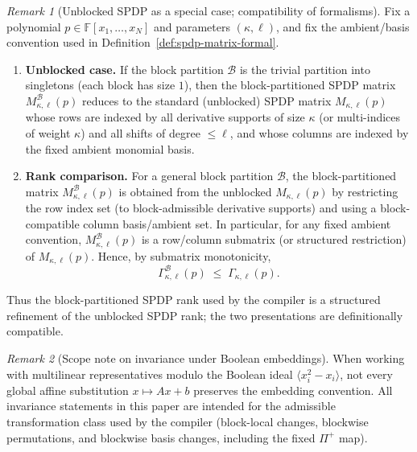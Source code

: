 \documentclass[12pt]{article}
\theoremstyle{definition}
\theoremstyle{definition}
\theoremstyle{remark}
\newtheorem{remark}{Remark}
\theoremstyle{remark}
\begin{document}
\begin{remark}[Unblocked SPDP as a special case; compatibility of formalisms]
\label{rem:unblocked-spdp-compatibility}
Fix a polynomial $p\in\mathbb{F}[x_1,\dots,x_N]$ and parameters $(\kappa,\ell)$, and
fix the ambient/basis convention used in Definition~\ref{def:spdp-matrix-formal}.

\begin{enumerate}[label=(\roman*)]
\item \textbf{Unblocked case.} If the block partition $\mathcal{B}$ is the
trivial partition into singletons (each block has size $1$), then the
block-partitioned SPDP matrix $M^{\mathcal{B}}_{\kappa,\ell}(p)$ reduces to the
standard (unblocked) SPDP matrix $M_{\kappa,\ell}(p)$ whose rows are indexed by
all derivative supports of size $\kappa$ (or multi-indices of weight $\kappa$) and all
shifts of degree $\le \ell$, and whose columns are indexed by the fixed
ambient monomial basis.

\item \textbf{Rank comparison.} For a general block partition $\mathcal{B}$,
the block-partitioned matrix $M^{\mathcal{B}}_{\kappa,\ell}(p)$ is obtained from
the unblocked $M_{\kappa,\ell}(p)$ by restricting the row index set (to
block-admissible derivative supports) and using a block-compatible column
basis/ambient set. In particular, for any fixed ambient convention,
$M^{\mathcal{B}}_{\kappa,\ell}(p)$ is a row/column submatrix (or structured
restriction) of $M_{\kappa,\ell}(p)$. Hence, by submatrix monotonicity,
\[
\Gamma^{\mathcal{B}}_{\kappa,\ell}(p)\;\le\;\Gamma_{\kappa,\ell}(p).
\]
\end{enumerate}

Thus the block-partitioned SPDP rank used by the compiler is a structured
refinement of the unblocked SPDP rank; the two presentations are definitionally
compatible.
\end{remark}

\begin{remark}[Scope note on invariance under Boolean embeddings]
\label{rem:boolean-embedding-scope}
When working with multilinear representatives modulo the Boolean ideal
$\langle x_i^2-x_i\rangle$, not every global affine substitution
$x\mapsto Ax+b$ preserves the embedding convention. All invariance statements
in this paper are intended for the admissible transformation class used by the
compiler (block-local changes, blockwise permutations, and blockwise basis
changes, including the fixed $\Pi^{+}$ map).
\end{remark}
\end{document}
